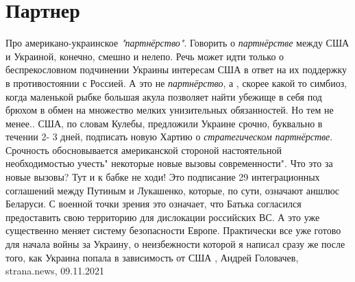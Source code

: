  
 
 
 
 
\chapter{Партнер}
\label{sec:slova.partner}

Про американо-украинское \emph{"партнёрство"}.
Говорить о \emph{партнёрстве} между США и Украиной, конечно, смешно и нелепо.
Речь может идти только о беспрекословном подчинении Украины интересам США в
ответ на их поддержку в противостоянии с Россией. А это не \emph{партнёрство},
а , скорее какой то симбиоз, когда маленькой рыбке большая акула позволяет
найти убежище в себя под брюхом в обмен на множество мелких унизительных
обязанностей. Но тем не менее..  США, по словам Кулебы, предложили Украине
срочно, буквально в течении 2- 3 дней, подписать новую Хартию о
\emph{стратегическом партнёрстве}. Срочность обосновывается американской
стороной настоятельной необходимостью учесть" некоторые новые вызовы
современности".  Что это за новые вызовы? Тут и к бабке не ходи! Это подписание
29 интеграционных соглашений между Путиным и Лукашенко, которые, по сути,
означают аншлюс Беларуси. С военной точки зрения это означает, что Батька
согласился предоставить свою территорию для дислокации российских ВС. А это уже
существенно меняет систему безопасности Европе. Практически все уже готово для
начала войны за Украину, о неизбежности которой я написал сразу же после того,
как Украина попала в зависимость от США
, 
Андрей Головачев, strana.news, 09.11.2021

